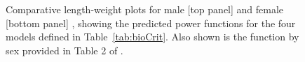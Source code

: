 \begin{figure}[htp]
\captionsetup[subfigure]{labelformat=empty}
\begin{center}
\newline
{}
\end{center}
\caption{Comparative length-weight plots for male [top panel] and female [bottom panel] \fishname, showing the predicted power functions for the four models defined in Table~\ref{tab:bioCrit}. Also shown is the function by sex provided in Table 2 of \citet{arf2001}.}
\label{fig:lwCompare}
\end{figure}

